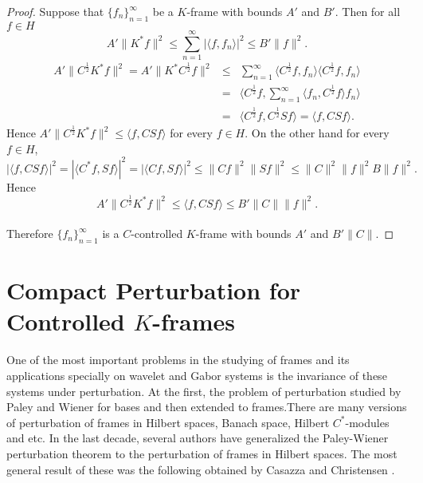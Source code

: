 \documentclass[11pt]{amsart}
\theoremstyle{definition}
\theoremstyle{remark}
\numberwithin{equation}{section}
\begin{document}
\begin{proof}
Suppose that $\{f_n\}_{n=1}^\infty$ be a $K$-frame with bounds $A'$ and $B'$. Then for all $f\in H$
\[A'\|K^*f\|^2\le\sum_{n=1}^{\infty}|\langle f,f_n\rangle|^2\le B'\|f\|^2.\]
\begin{eqnarray*}
A'\|C^{\frac{1}{2}}K^*f\|^2 = A'\|K^*C^{\frac{1}{2}}f\|^2 & \le &
\sum_{n=1}^{\infty}\langle C^{\frac{1}{2}}f,f_n\rangle\langle C^{\frac{1}{2}}f,f_n\rangle\\
 & = & \langle C^{\frac{1}{2}}f,\sum_{n=1}^{\infty}\langle f_n,C^{\frac{1}{2}}f\rangle f_n\rangle\\
 & = & \langle C^{\frac{1}{2}}f, C^{\frac{1}{2}}Sf\rangle = \langle f,CSf\rangle.
 \end{eqnarray*}
Hence $A'\|C^{\frac{1}{2}}K^*f\|^2\le\langle f,CSf\rangle$ for every $f\in H $. On the other hand for every  $f\in H$,
\[|\langle f,CSf\rangle|^2=|\langle C^*f,Sf\rangle|^2=|\langle Cf,Sf\rangle|^2\le\|Cf\|^2\|Sf\|^2\le\|C\|^2\|f\|^2B\|f\|^2.\]
Hence \[A'\|C^{\frac{1}{2}}K^*f\|^2\le\langle f,CSf\rangle\le B'\|C\|\|f\|^2.\] \\
Therefore $\{f_n\}_{n=1}^\infty$ is a $C$-controlled $K$-frame with bounds $A'$ and $B'\|C\|$.
\end{proof}

\section{Compact Perturbation for Controlled $K$-frames}
One of the most important problems in the studying of frames and its applications specially on wavelet and Gabor systems is the invariance of these systems under perturbation. At the first, the problem of perturbation studied by Paley and Wiener for bases and then extended to frames.There are many versions of perturbation of frames in Hilbert spaces, Banach space, Hilbert $C^*$-modules and etc.  In the last decade, several authors have
generalized the Paley-Wiener perturbation theorem to the perturbation of frames in Hilbert spaces. The most general result of these was the following obtained by Casazza and Christensen \cite{ole1}.
\end{document}

